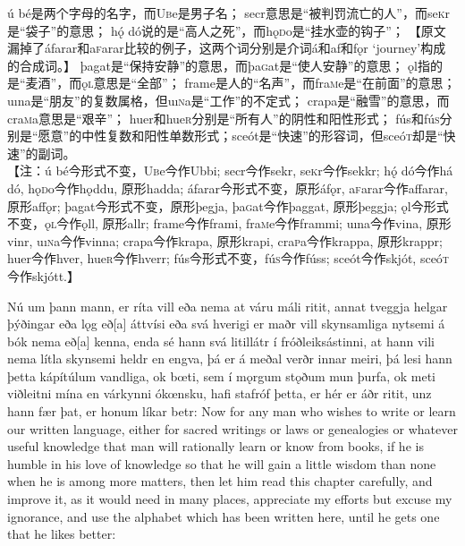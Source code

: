 \begin{translation*}{}
  ú bé是两个字母的名字，而U\textsc{b}e是男子名；
  secr意思是“被判罚流亡的人”，而se\textsc{k}r是“袋子”的意思；
  hǫ́ dó说的是“高人之死”，而hǫ\textsc{d}o是“挂水壶的钩子”；
  【原文漏掉了áfarar和a\textsc{f}arar比较的例子，这两个词分别是介词á和af和fǫr `journey'构成的合成词。】
  þagat是“保持安静”的意思，而þa\textsc{g}at是“使人安静”的意思；
  ǫl指的是“麦酒”，而ǫ\textsc{l}意思是“全部”；
  frame是人的“名声”，而fra\textsc{m}e是“在前面”的意思；
  uına是“朋友”的复数属格，但uı\textsc{n}a是“工作”的不定式；
  crapa是“融雪”的意思，而cra\textsc{m}a意思是“艰辛”； huer和hue\textsc{r}分别是“所有人”的阴性和阳性形式；
  fús和fú\textsc{s}分别是“愿意”的中性复数和阳性单数形式；sceót是“快速”的形容词，但sceó\textsc{t}却是“快速”的副词。\\

  【注：ú bé今形式不变，U\textsc{b}e今作Ubbi;
  secr今作sekr, se\textsc{k}r今作sekkr;
  h\'{ǫ} dó今作há dó, hǫ\textsc{d}o今作hǫddu, 原形hadda;
  áfarar今形式不变，原形áfǫr, a\textsc{f}arar今作affarar, 原形affǫr;
  þagat今形式不变，原形þegja, þa\textsc{g}at今作þaggat, 原形þeggja;
  ǫl今形式不变，ǫ\textsc{l}今作ǫll, 原形allr;
  frame今作frami, fra\textsc{m}e今作frammi;
  uına今作vina, 原形vinr, uı\textsc{n}a今作vinna; crapa今作krapa, 原形krapi, cra\textsc{p}a今作krappa, 原形krappr;
  huer今作hver, hue\textsc{r}今作hverr;
  fús今形式不变，fú\textsc{s}今作fúss;
  sceót今作skjót, sceó\textsc{t}今作skjótt.】
\end{translation*}
\begin{paracol}{2}
  Nú um þann mann, er ríta vill eða nema at váru máli ritit, annat tveggja helgar þýðingar eða lǫg eð[a] áttvísi eða svá hverigi er maðr vill skynsamliga nytsemi á bók nema eð[a] kenna, enda sé hann svá litillátr í fróðleiksástinni, at hann vili nema lítla skynsemi heldr en engva, þá er á meðal verðr innar meiri, þá lesi hann þetta kápítúlum vandliga, ok bœti, sem í mǫrgum stǫðum mun þurfa, ok meti viðleitni mína en várkynni ókœnsku, hafi stafróf þetta, er hér er áðr ritit, unz hann fær þat, er honum líkar betr:
  \switchcolumn
  Now for any man who wishes to write or learn our written language, either for sacred writings or laws or genealogies or whatever useful knowledge that man will rationally learn or know from books, if he is humble in his love of knowledge so that he will gain a little wisdom than none when he is among more matters, then let him read this chapter carefully, and improve it, as it would need in many places, appreciate my efforts but excuse my ignorance, and use the alphabet which has been written here, until he gets one that he likes better:
\end{paracol}
